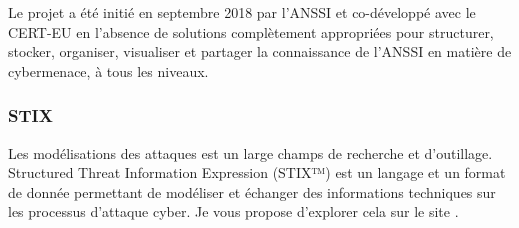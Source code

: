 Le projet  a été initié en septembre 2018 par l’ANSSI et co-développé avec le CERT-EU en l’absence de solutions complètement appropriées pour structurer, stocker, organiser, visualiser et partager la connaissance de l’ANSSI en matière de cybermenace, à tous les niveaux.


\subsubsection{STIX}


Les modélisations des attaques est un large champs de recherche et d'outillage.
Structured Threat Information Expression (STIX™) est un langage et un format de donnée permettant de modéliser et échanger des informations techniques sur les processus d'attaque cyber. 
Je vous propose d'explorer cela sur le site .

